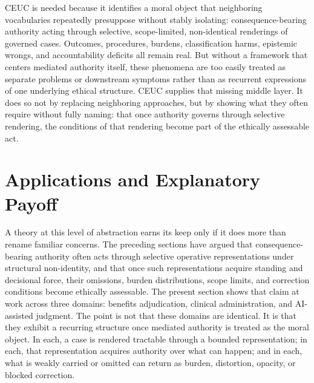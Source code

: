 \documentclass[11pt]{article}
\begin{document}
CEUC is needed because it identifies a moral object that neighboring vocabularies repeatedly presuppose without stably isolating: consequence-bearing authority acting through selective, scope-limited, non-identical renderings of governed cases. Outcomes, procedures, burdens, classification harms, epistemic wrongs, and accountability deficits all remain real. But without a framework that centers mediated authority itself, these phenomena are too easily treated as separate problems or downstream symptoms rather than as recurrent expressions of one underlying ethical structure. CEUC supplies that missing middle layer. It does so not by replacing neighboring approaches, but by showing what they often require without fully naming: that once authority governs through selective rendering, the conditions of that rendering become part of the ethically assessable act. \cite{BowkerStar1999SortingThingsOut,Fricker2007EpistemicInjustice,MoynihanHerdHarvey2015AdministrativeBurden,LepriEtAl2018FairTransparentAccountableADM,Tabassi2023NISTAIRMF,Swanson2026MediatedJudgmentConstraint}
\section{Applications and Explanatory Payoff}

A theory at this level of abstraction earns its keep only if it does more than rename familiar concerns. The preceding sections have argued that consequence-bearing authority often acts through selective operative representations under structural non-identity, and that once such representations acquire standing and decisional force, their omissions, burden distributions, scope limits, and correction conditions become ethically assessable. The present section shows that claim at work across three domains: benefits adjudication, clinical administration, and AI-assisted judgment. The point is not that these domains are identical. It is that they exhibit a recurring structure once mediated authority is treated as the moral object. In each, a case is rendered tractable through a bounded representation; in each, that representation acquires authority over what can happen; and in each, what is weakly carried or omitted can return as burden, distortion, opacity, or blocked correction. \cite{BowkerStar1999SortingThingsOut,Douglas2004IrreducibleComplexityObjectivity,Fricker2007EpistemicInjustice,MoynihanHerdHarvey2015AdministrativeBurden,Eubanks2018AutomatingInequality,LepriEtAl2018FairTransparentAccountableADM,Tabassi2023NISTAIRMF}
\end{document}
